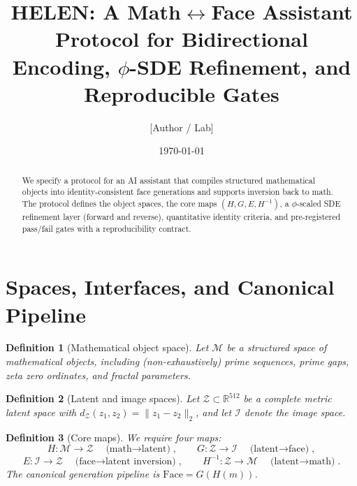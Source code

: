 \documentclass[12pt]{amsart}
\title[HELEN Math--Face Assistant Protocol]{HELEN: A Math$\leftrightarrow$Face Assistant\\
Protocol for Bidirectional Encoding, $\phi$-SDE Refinement, and Reproducible Gates}
\author{[Author / Lab]}
\date{\today}
\numberwithin{equation}{section}
\newtheorem{definition}{Definition}[section]
\newcommand{\RR}{\mathbb{R}}
\newcommand{\cM}{\mathcal{M}}
\newcommand{\cZ}{\mathcal{Z}}
\newcommand{\cI}{\mathcal{I}}
\begin{document}
\maketitle
\begin{abstract}
We specify a protocol for an AI assistant that compiles structured mathematical
objects into identity-consistent face generations and supports inversion back to math.
The protocol defines the object spaces, the core maps $(H,G,E,H^{-1})$, a $\phi$-scaled
SDE refinement layer (forward and reverse), quantitative identity criteria, and
pre-registered pass/fail gates with a reproducibility contract.
\end{abstract}
\tableofcontents
\section{Spaces, Interfaces, and Canonical Pipeline}
\begin{definition}[Mathematical object space]
Let $\cM$ be a structured space of mathematical objects, including (non-exhaustively)
prime sequences, prime gaps, zeta zero ordinates, and fractal parameters.
\end{definition}
\begin{definition}[Latent and image spaces]
Let $\cZ\subset \RR^{512}$ be a complete metric latent space with
$d_{\cZ}(z_1,z_2)=\|z_1-z_2\|_2$, and let $\cI$ denote the image space.
\end{definition}
\begin{definition}[Core maps]
We require four maps:
\[
H:\cM\to \cZ \quad\text{(math$\to$latent)},\qquad
G:\cZ\to \cI \quad\text{(latent$\to$face)},
\]
\[
E:\cI\to \cZ \quad\text{(face$\to$latent inversion)},\qquad
H^{-1}:\cZ\to \cM \quad\text{(latent$\to$math)}.
\]
The canonical generation pipeline is $\mathrm{Face}=G(H(m))$.
\end{definition}
\end{document}

